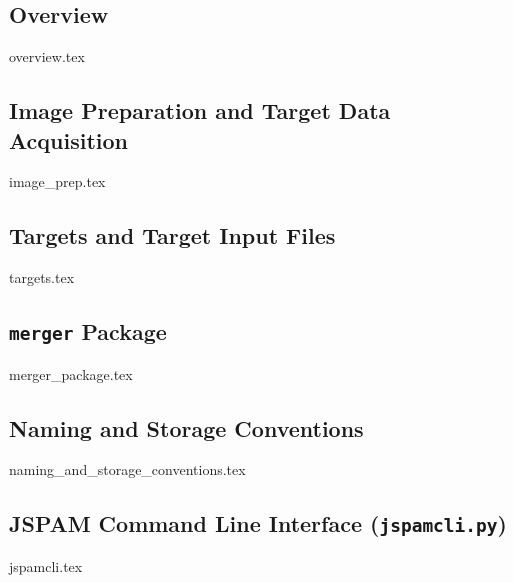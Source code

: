 \subsection{Overview}
{overview.tex}


\subsection{Image Preparation and Target Data Acquisition}
{image_prep.tex}

\subsection{Targets and Target Input Files}
{targets.tex}

\subsection{\texttt{merger} Package}
{merger_package.tex}

\subsection{Naming and Storage Conventions}
{naming_and_storage_conventions.tex}

\subsection{JSPAM Command Line Interface (\texttt{jspamcli.py})}\label{subsec:jspamcli}
{jspamcli.tex}




